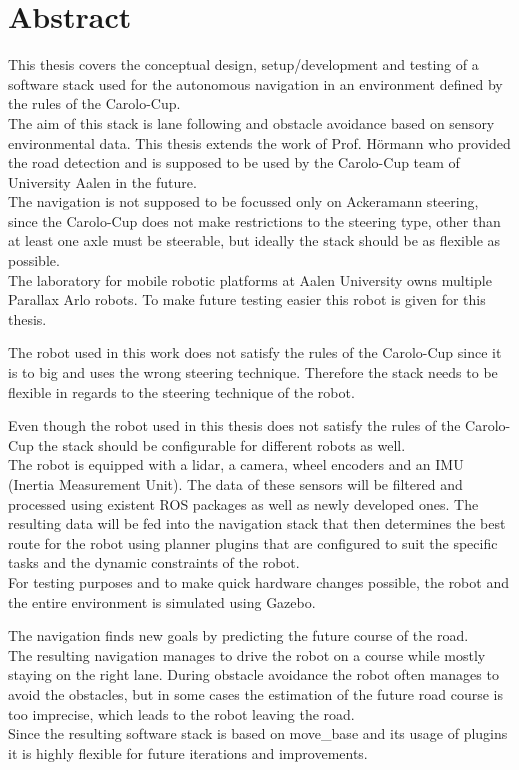 \chapter*{Abstract}
\label{abstract}
This thesis covers the conceptual design, setup/development and testing of a software stack used for the autonomous navigation in an environment defined by the rules of the Carolo-Cup.\\

 The aim of this stack is lane following and obstacle avoidance based on sensory environmental data. This thesis extends the work of Prof. Hörmann who provided the road detection and is supposed to be used by the Carolo-Cup team of University Aalen in the future.\\
 
 The navigation is not supposed to be focussed only on Ackeramann steering, since the Carolo-Cup does not make restrictions to the steering type, other than at least one axle must be steerable, but ideally the stack should be as flexible as possible\cite{carolocup}.\\
 The laboratory for mobile robotic platforms at Aalen University owns multiple Parallax Arlo robots. To make future testing easier this robot is given for this thesis.

 The robot used in this work does not satisfy the rules of the Carolo-Cup since it is to big and uses the wrong steering technique. Therefore the stack needs to be flexible in regards to the steering technique of the robot.
 
 Even though the robot used in this thesis does not satisfy the rules of the Carolo-Cup the stack should be configurable for different robots as well.\\

The robot is equipped with a lidar, a camera, wheel encoders and an IMU (Inertia Measurement Unit). The data of these sensors will be filtered and processed using existent ROS packages as well as newly developed ones. The resulting data will be fed into the navigation stack that then determines the best route for the robot using planner plugins that are configured to suit the specific tasks and the dynamic constraints of the robot.\\

For testing purposes and to make quick hardware changes possible, the robot and the entire environment is simulated using Gazebo.\\

The navigation finds new goals by predicting the future course of the road.\\

The resulting navigation manages to drive the robot on a course while mostly staying on the right lane. During obstacle avoidance the robot often manages to avoid the obstacles, but in some cases the estimation of the future road course is too imprecise, which leads to the robot leaving the road.\\

Since the resulting software stack is based on move\_base and its usage of plugins it is highly flexible for future iterations and improvements.\\